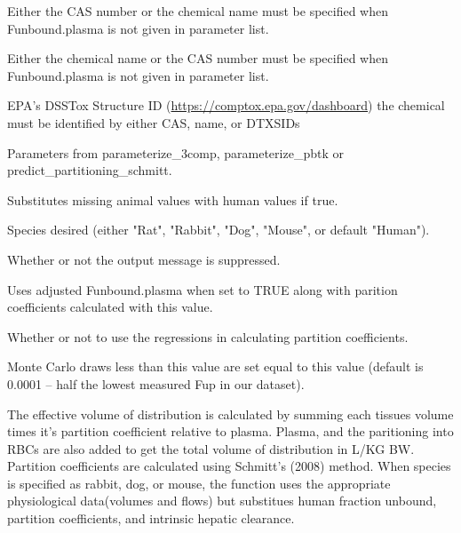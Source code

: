 \documentclass[a4paper]{book}
\begin{document}
\begin{Arguments}
\begin{ldescription}
\item[\code{chem.cas}] Either the CAS number or the chemical name must be specified
when Funbound.plasma is not given in parameter list.

\item[\code{chem.name}] Either the chemical name or the CAS number must be
specified when Funbound.plasma is not given in parameter list.

\item[\code{dtxsid}] EPA's DSSTox Structure ID (\url{https://comptox.epa.gov/dashboard})
the chemical must be identified by either CAS, name, or DTXSIDs

\item[\code{parameters}] Parameters from parameterize\_3comp, parameterize\_pbtk or
predict\_partitioning\_schmitt.

\item[\code{default.to.human}] Substitutes missing animal values with human values
if true.

\item[\code{species}] Species desired (either "Rat", "Rabbit", "Dog", "Mouse", or
default "Human").

\item[\code{suppress.messages}] Whether or not the output message is suppressed.

\item[\code{adjusted.Funbound.plasma}] Uses adjusted Funbound.plasma when set to
TRUE along with parition coefficients calculated with this value.

\item[\code{regression}] Whether or not to use the regressions in calculating
partition coefficients.

\item[\code{minimum.Funbound.plasma}] Monte Carlo draws less than this value are set 
equal to this value (default is 0.0001 -- half the lowest measured Fup in our
dataset).
\end{ldescription}
\end{Arguments}
%
\begin{Details}\relax
The effective volume of distribution is calculated by summing each tissues
volume times it's partition coefficient relative to plasma. Plasma, and the
paritioning into RBCs are also added to get the total volume of distribution
in L/KG BW. Partition coefficients are calculated using Schmitt's (2008)
method.  When species is specified as rabbit, dog, or mouse, the function
uses the appropriate physiological data(volumes and flows) but substitues
human fraction unbound, partition coefficients, and intrinsic hepatic
clearance.
\end{Details}
\end{document}
